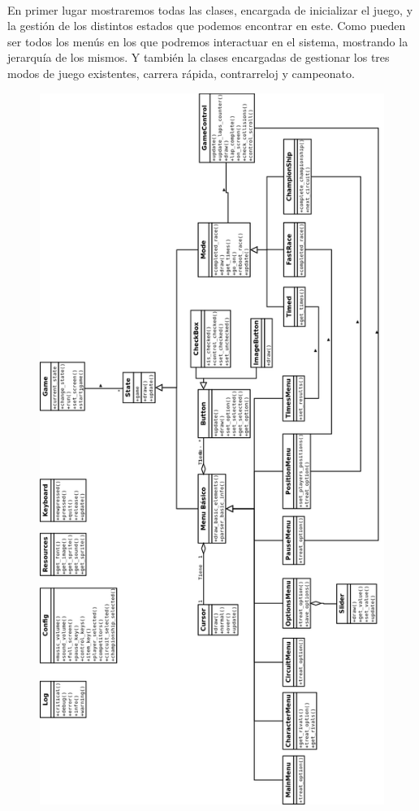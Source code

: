 \paragraph{}
En primer lugar mostraremos todas las clases, encargada de inicializar el juego, y la gestión de los distintos estados que
podemos encontrar en este. Como pueden ser todos los menús en los que podremos interactuar en el sistema, mostrando la jerarquía 
de los mismos. Y también la clases encargadas de gestionar los tres modos de juego existentes, carrera rápida, contrarreloj y 
campeonato.


\begin{figure}[H]
  \label{diagrama_clases_diseno}
  \begin{center}
    \includegraphics[scale=0.38]{imagenes/diseno/diagrama_clases_diseno1.png}

\end{center}
\end{figure}
